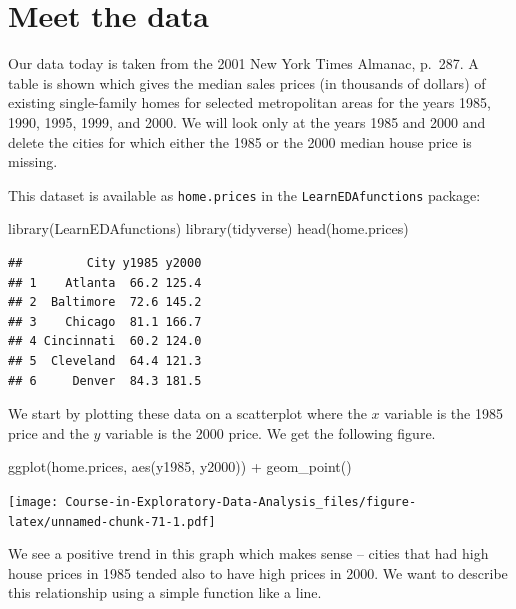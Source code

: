 \documentclass[
]{book}
\newenvironment{Shaded}{\begin{snugshade}}{\end{snugshade}}
\newcommand{\FunctionTok}[1]{\textcolor[rgb]{0.00,0.00,0.00}{#1}}
\newcommand{\NormalTok}[1]{#1}
\newcommand{\SpecialCharTok}[1]{\textcolor[rgb]{0.00,0.00,0.00}{#1}}
\begin{document}
\hypertarget{meet-the-data-3}{%
\section{Meet the data}\label{meet-the-data-3}}

Our data today is taken from the 2001 New York Times Almanac, p.~287. A table is shown which gives the median sales prices (in thousands of dollars) of existing single-family homes for selected metropolitan areas for the years 1985, 1990, 1995, 1999, and 2000. We will look only at the years 1985 and 2000 and delete the cities for which either the 1985 or the 2000 median house price is missing.

This dataset is available as \texttt{home.prices} in the \texttt{LearnEDAfunctions} package:

\begin{Shaded}
\begin{Highlighting}[]
\FunctionTok{library}\NormalTok{(LearnEDAfunctions)}
\FunctionTok{library}\NormalTok{(tidyverse)}
\FunctionTok{head}\NormalTok{(home.prices)}
\end{Highlighting}
\end{Shaded}

\begin{verbatim}
##         City y1985 y2000
## 1    Atlanta  66.2 125.4
## 2  Baltimore  72.6 145.2
## 3    Chicago  81.1 166.7
## 4 Cincinnati  60.2 124.0
## 5  Cleveland  64.4 121.3
## 6     Denver  84.3 181.5
\end{verbatim}

We start by plotting these data on a scatterplot where the \(x\) variable is the 1985 price and the \(y\) variable is the 2000 price. We get the following figure.

\begin{Shaded}
\begin{Highlighting}[]
\FunctionTok{ggplot}\NormalTok{(home.prices, }\FunctionTok{aes}\NormalTok{(y1985, y2000)) }\SpecialCharTok{+}
  \FunctionTok{geom\_point}\NormalTok{()}
\end{Highlighting}
\end{Shaded}

\texttt{[image: Course-in-Exploratory-Data-Analysis\_files/figure-latex/unnamed-chunk-71-1.pdf]}

We see a positive trend in this graph which makes sense -- cities that had high house prices in 1985 tended also to have high prices in 2000. We want to describe this relationship using a simple function like a line.
\end{document}
